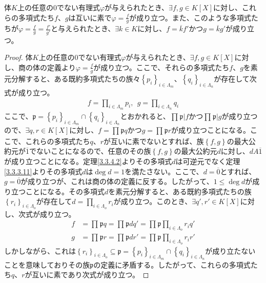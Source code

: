 \documentclass[dvipdfmx]{jsarticle}
\begin{document}
\begin{thm}\label{3.3.4.21}
体$K$上の任意の$0$でない有理式$\varphi$が与えられたとき、$\exists f,g \in K[ X]$に対し、これらの多項式たち$f$、$g$は互いに素で$\varphi = \frac{f}{g}$が成り立つ。また、このような多項式たちが$\varphi = \frac{f}{g} = \frac{f'}{g'}$と与えられたとき、$\exists k \in K$に対し、$f = \overline{k}f'$かつ$g = \overline{k}g'$が成り立つ。
\end{thm}
\begin{proof}
体$K$上の任意の$0$でない有理式$\varphi$が与えられたとき、$\exists f,g \in K[ X]$に対し、商の体の定義より$\varphi = \frac{f}{g}$が成り立つ。ここで、それらの多項式たち$f$、$g$を素元分解すると、ある既約多項式たちの族々$\left\{ p_{i} \right\}_{i \in \varLambda_{m}}$、$\left\{ q_{i} \right\}_{i \in \varLambda_{n}}$が存在して次式が成り立つ。
\begin{align*}
f = \prod_{i \in \varLambda_{m}} p_{i},\ \ g = \prod_{i \in \varLambda_{n}} q_{i}
\end{align*}
ここで、$\mathfrak{p}=\left\{ p_{i} \right\}_{i \in \varLambda_{m}} \cap \left\{ q_{i} \right\}_{i \in \varLambda_{n}}$とおかれると、$\prod_{} \mathfrak{p}|f$かつ$\prod_{} \mathfrak{p}|g$が成り立つので、$\exists q,r \in K[ X]$に対し、$f = \prod_{} \mathfrak{p}q$かつ$g = \prod_{} \mathfrak{p}r$が成り立つことになる。ここで、これらの多項式たち$q$、$r$が互いに素でないとすれば、族$\left\{ f,g \right\}$の最大公約元が$\overline{1}$でないことになるので、任意のその族$\left\{ f,g \right\}$の最大公約元$d$に対し、$dA\overline{1}$が成り立つことになる。定理\ref{3.3.4.2}よりその多項式$d$は可逆元でなく定理\ref{3.3.3.11}よりその多項式$d$は$\deg d = 1$を満たさない。ここで、$d = \overline{0}$とすれば、$g = \overline{0}$が成り立つが、これは商の体の定義に反する。したがって、$1 \leq \deg d$が成り立つことになる。その多項式$d$を素元分解すると、ある既約多項式たちの族$\left\{ r_{i} \right\}_{i \in \varLambda_{o}}$が存在して$d = \prod_{i \in \varLambda_{o}} r_{i}$が成り立つ。このとき、$\exists q',r' \in K[ X]$に対し、次式が成り立つ。
\begin{align*}
f &= \prod_{} \mathfrak{p}q = \prod_{} \mathfrak{p}dq' = \prod_{} \mathfrak{p}\prod_{i \in \varLambda_{o}} r_{i}q'\\
g &= \prod_{} \mathfrak{p}r = \prod_{} \mathfrak{p}dr' = \prod_{} \mathfrak{p}\prod_{i \in \varLambda_{o}} r_{i}r'
\end{align*}
しかしながら、これは$\left\{ r_{i} \right\}_{i \in \varLambda_{o}}\subseteq \mathfrak{p} =\left\{ p_{i} \right\}_{i \in \varLambda_{m}} \cap \left\{ q_{i} \right\}_{i \in \varLambda_{n}}$が成り立たないことを意味しておりその族$\mathfrak{p}$の定義に矛盾する。したがって、これらの多項式たち$q$、$r$が互いに素であり次式が成り立つ。

\end{proof}
\end{document}
